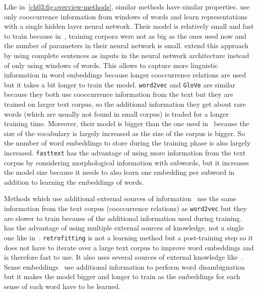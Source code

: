     Like in~\autoref{ch03:fig:overview-methods}, similar methods have similar
    properties. \citeauthor{collobert2008unified} \citep{collobert2008unified}
    use only cooccurrence information from windows of words and learn
    representations with a single hidden layer neural network. Their model is
    relatively small and fast to train because
    in~\citeyear{collobert2008unified}, training corpora were not as big as the
    ones used now and the number of parameters in their neural network is small.
    \citeauthor{collobert2011natural} \citep{collobert2011natural} extend this
    approach by using complete sentences as inputs in the neural network
    architecture instead of only using windows of words. This allows to capture
    more linguistic information in word embeddings because longer cooccurrence
    relations are used but it takes a bit longer to train the model.
    \texttt{word2vec} and \texttt{GloVe} are similar because they both use
    cooccurrence information from the text but they are trained on larger text
    corpus, so the additional information they get about rare words (which are
    usually not found in small corpus) is traded for a longer training time.
    Moreover, their model is bigger than the one used
    in~\citep{collobert2008unified, collobert2011natural} because the size of
    the vocabulary is largely increased as the size of the corpus is bigger. So
    the number of word embeddings to store during the training phase is also
    largely increased. \texttt{fasttext} has the advantage of using more
    information from the text corpus by considering morphological information
    with subwords, but it increases the model size because it needs to also
    learn one embedding per subword in addition to learning the embeddings of
    words. \medskip

    Methods which use additional external sources of
    information~\citep{yudredze2014improving, kiela2015specializing} use the
    same information from the text corpus (cooccurrence relations) as
    \texttt{word2vec} but they are slower to train because of the additional
    information used during training.~\citet{kiela2015specializing} has the
    advantage of using multiple external sources of knowledge, not a single one
    like in~\citet{yudredze2014improving}. \texttt{retrofitting} is not a
    learning method but a post-training step so it does not have to iterate over
    a large text corpus to improve word embeddings and is therefore fast to use.
    It also uses several sources of external knowledge
    like~\citet{kiela2015specializing}. Sense
    embeddings~\citep{iacobacci2015sensembed} use additional information to
    perform word disambiguation but it makes the model bigger and longer to
    train as the embeddings for each sense of each word have to be learned.
    \medskip

